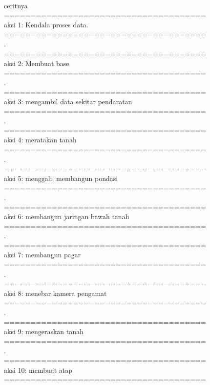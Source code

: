 ceritnya\\
======================================\\
aksi 1: Kendala proses data.\\
======================================\\
.\\
======================================\\
aksi 2: Membuat base\\
======================================\\
.\\
======================================\\
aksi 3: mengambil data sekitar pendaratan\\
======================================\\
.\\
======================================\\
aksi 4: meratakan tanah\\
======================================\\
.\\
======================================\\
aksi 5: menggali, membangun pondasi\\
======================================\\
.\\
======================================\\
aksi 6: membangun jaringan bawah tanah\\
======================================\\
.\\
======================================\\
aksi 7: membangun pagar\\
======================================\\
.\\
======================================\\
aksi 8: menebar kamera pengamat\\
======================================\\
.\\
======================================\\
aksi 9: mengeraskan tanah\\
======================================\\
.\\
======================================\\
aksi 10: membuat atap\\
======================================\\